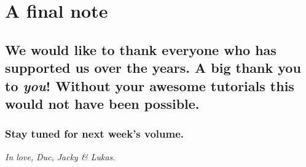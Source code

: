 \documentclass[a4paper]{article}
\renewcommand{\hline}{\noindent\makebox[\linewidth]{\rule{12cm}{1pt}}}
\newcommand{\vip}[1]{\textit{\textbf{#1}}}
\begin{document}
\hline 

\section*{A final note}
\subsection*{We would like to thank everyone who has supported us over the years. A big thank you to \vip{you}! Without your awesome tutorials this would not have been possible.}
\subsubsection*{Stay tuned for next week's volume.}

\emph{In love,} \emph{Duc, Jacky \& Lukas.}
\end{document}
